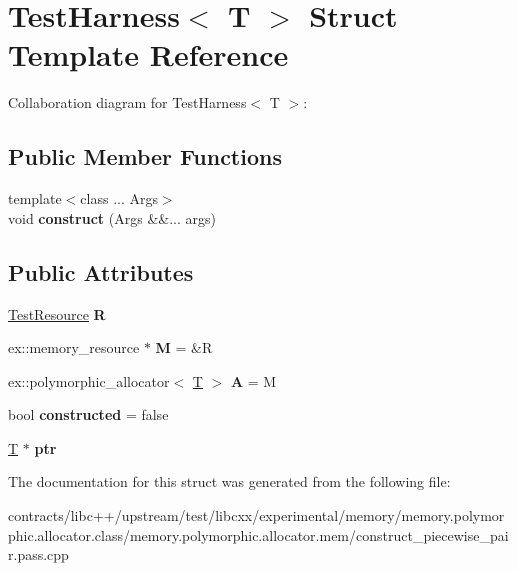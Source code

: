 \hypertarget{struct_test_harness}{}\section{Test\+Harness$<$ T $>$ Struct Template Reference}
\label{struct_test_harness}


Collaboration diagram for Test\+Harness$<$ T $>$\+:
\subsection*{Public Member Functions}
\begin{DoxyCompactItemize}
\item 
\mbox{\label{struct_test_harness_a10d75cda797777480597e4f559b41079}} 
{\footnotesize template$<$class ... Args$>$ }\\void {\bfseries construct} (Args \&\&... args)
\end{DoxyCompactItemize}
\subsection*{Public Attributes}
\begin{DoxyCompactItemize}
\item 
\mbox{\label{struct_test_harness_a0f0153e4d949b840d6e7a20f7a8150df}} 
\mbox{\hyperlink{class_test_resource_imp}{Test\+Resource}} {\bfseries R}
\item 
\mbox{\label{struct_test_harness_abc624ee698fc4ceb65740ff2de5e9e04}} 
ex\+::memory\+\_\+resource $\ast$ {\bfseries M} = \&R
\item 
\mbox{\label{struct_test_harness_abf705304421b436269dd91574b88d224}} 
ex\+::polymorphic\+\_\+allocator$<$ \mbox{\hyperlink{struct_t}{T}} $>$ {\bfseries A} = M
\item 
\mbox{\label{struct_test_harness_a48cb0918a0b7356d120d4ed4a609ed3f}} 
bool {\bfseries constructed} = false
\item 
\mbox{\label{struct_test_harness_a8070b661d75bc2b3e74221d7af41582a}} 
\mbox{\hyperlink{struct_t}{T}} $\ast$ {\bfseries ptr}
\end{DoxyCompactItemize}


The documentation for this struct was generated from the following file\+:\begin{DoxyCompactItemize}
\item 
contracts/libc++/upstream/test/libcxx/experimental/memory/memory.\+polymorphic.\+allocator.\+class/memory.\+polymorphic.\+allocator.\+mem/construct\+\_\+piecewise\+\_\+pair.\+pass.\+cpp\end{DoxyCompactItemize}
